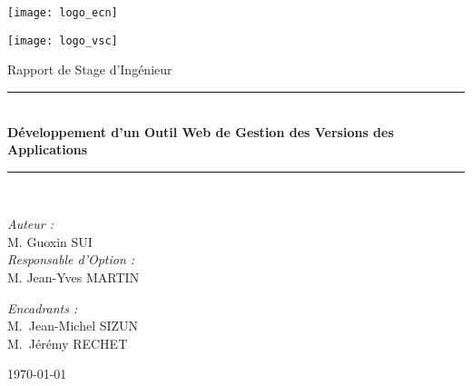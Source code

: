 \begin{titlepage}

\noindent
\begin{minipage}{0.3\textwidth}
  \begin{flushleft} \large
    \texttt{[image: logo\_ecn]}\\[1cm]
  \end{flushleft}
\end{minipage}%
\hfill
\begin{minipage}{0.3\textwidth}
  \begin{flushright} \large
    \texttt{[image: logo\_vsc]}\\[1cm]
  \end{flushright}
\end{minipage}

\begin{center}
\vskip 2cm

{\large Rapport de Stage d'Ingénieur}\\[0.5cm]

\rule{\linewidth}{0.5mm} \\[0.4cm]
{ \huge \bfseries Développement d’un Outil Web de Gestion des Versions des Applications \\[0.4cm] }
\rule{\linewidth}{0.5mm} \\[1.5cm]

\noindent
\begin{minipage}{0.4\textwidth}
  \begin{flushleft} \large
    \emph{Auteur :}\\
    M. Guoxin \textsc{SUI}\\
    \bigbreak
    \emph{Responsable d'Option :}\\
    M. Jean-Yves \textsc{MARTIN}\\
  \end{flushleft}
\end{minipage}%
\hfill
\begin{minipage}{0.4\textwidth}
  \begin{flushright} \large
    \emph{Encadrants :} \\
    M.~Jean-Michel \textsc{SIZUN}\\
    M.~Jérémy \textsc{RECHET}
  \end{flushright}
\end{minipage}

\vfill

{\large \today}

\end{center}
\end{titlepage}
